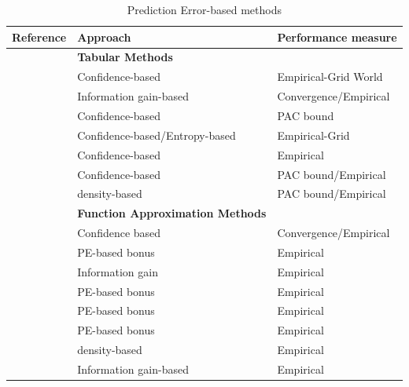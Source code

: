\begin{table}
\centering
\begin{tabular}{p{5cm}|p{5cm}|p{4cm}}
    Reference & Approach & Performance measure \\
    \hline
    &\textbf{Tabular Methods}& \\
    \hline
     & Confidence-based  & Empirical-Grid World \\
     & Information gain-based  & Convergence/Empirical\\
     & Confidence-based & PAC bound \\
     & Confidence-based/Entropy-based & Empirical-Grid\\
     & Confidence-based &  Empirical \\
     & Confidence-based &  PAC bound/Empirical\\
     & density-based & PAC bound/Empirical\\
    \hline
    &\textbf{Function Approximation Methods}& \\
    \hline
     & Confidence based & Convergence/Empirical\\
     & PE-based bonus & Empirical\\
     & Information gain & Empirical\\
     & PE-based bonus & Empirical\\
     & PE-based bonus & Empirical\\
     & PE-based bonus & Empirical\\ 
     & density-based & Empirical\\
     & Information gain-based & Empirical\\
\end{tabular}
\caption{Prediction Error-based methods}
\label{tab:prediction-error}
\end{table}

